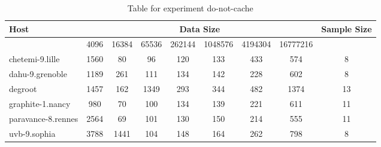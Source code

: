 \begin{table}
\caption{Table for experiment do-not-cache}
\begin{tabular}{@{}lcccccccc@{}}
\toprule
Host    & \multicolumn{7}{c}{Data Size}          & Sample Size \\ \midrule
& 4096  & 16384  & 65536  & 262144  & 1048576  & 4194304  & 16777216              \\ \midrule
chetemi-9.lille  & 1560  & 80  & 96  & 120  & 133  & 433  & 574  & 8 \\
dahu-9.grenoble  & 1189  & 261  & 111  & 134  & 142  & 228  & 602  & 8 \\
degroot  & 1457  & 162  & 1349  & 293  & 344  & 482  & 1374  & 13 \\
graphite-1.nancy  & 980  & 70  & 100  & 134  & 139  & 221  & 611  & 11 \\
paravance-8.rennes  & 2564  & 69  & 101  & 130  & 150  & 214  & 555  & 11 \\
uvb-9.sophia  & 3788  & 1441  & 104  & 148  & 164  & 262  & 798  & 8 \\
\bottomrule
\end{tabular}
\end{table}
